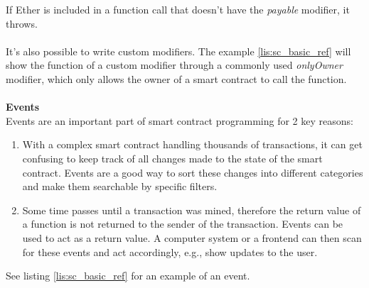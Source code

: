 If Ether is included in a function call that doesn't have the \textit{payable} modifier, it throws.
\\\\
It's also possible to write custom modifiers.
The example \ref{lis:sc_basic_ref} will show the function of a custom modifier through a commonly used \textit{onlyOwner} modifier, which only allows the owner of a smart contract to call the function.
\\\\
\textbf{Events}\\
Events are an important part of smart contract programming for 2 key reasons:
\begin{enumerate}
  \item With a complex smart contract handling thousands of transactions, it can get confusing to keep track of all changes made to the state of the smart contract.
  Events are a good way to sort these changes into different categories and make them searchable by specific filters.
  \item Some time passes until a transaction was mined, therefore the return value of a function is not returned to the sender of the transaction.
  Events can be used to act as a return value.
  A computer system or a frontend can then scan for these events and act accordingly, e.g., show updates to the user.
\end{enumerate}
See listing \ref{lis:sc_basic_ref} for an example of an event.
\\\\
